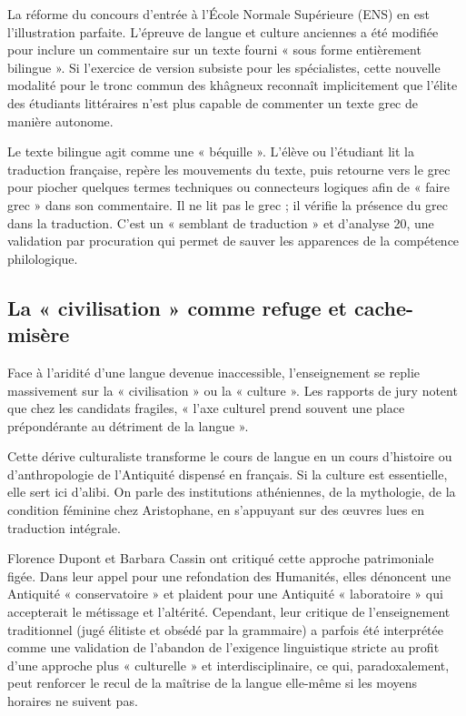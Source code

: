 La réforme du concours d'entrée à l'École Normale Supérieure (ENS) en est l'illustration parfaite.
L'épreuve de langue et culture anciennes a été modifiée pour inclure un commentaire sur un texte
fourni « sous forme entièrement bilingue ».\cite{I-3-3-ref17} Si l'exercice de version subsiste pour
les spécialistes, cette nouvelle modalité pour le tronc commun des khâgneux reconnaît implicitement
que l'élite des étudiants littéraires n'est plus capable de commenter un texte grec de manière
autonome.

Le texte bilingue agit comme une « béquille ».\cite{I-3-3-ref19} L'élève ou l'étudiant lit la
traduction française, repère les mouvements du texte, puis retourne vers le grec pour piocher
quelques termes techniques ou connecteurs logiques afin de « faire grec » dans son commentaire. Il
ne lit pas le grec ; il vérifie la présence du grec dans la traduction. C'est un « semblant de
traduction » et d'analyse 20, une validation par procuration qui permet de sauver les apparences de
la compétence philologique.



\subsection{La « civilisation » comme refuge et cache-misère}

Face à l'aridité d'une langue devenue inaccessible, l'enseignement se replie massivement sur la «
civilisation » ou la « culture ». Les rapports de jury notent que chez les candidats fragiles, «
l'axe culturel prend souvent une place prépondérante au détriment de la langue ».\cite{I-3-3-ref10}

Cette dérive culturaliste transforme le cours de langue en un cours d'histoire ou d'anthropologie de
l'Antiquité dispensé en français. Si la culture est essentielle, elle sert ici d'alibi. On parle des
institutions athéniennes, de la mythologie, de la condition féminine chez Aristophane, en s'appuyant
sur des œuvres lues en traduction intégrale.

Florence Dupont et Barbara Cassin ont critiqué cette approche patrimoniale figée. Dans leur appel
pour une refondation des Humanités, elles dénoncent une Antiquité « conservatoire » et plaident pour
une Antiquité « laboratoire » qui accepterait le métissage et l'altérité.\cite{I-3-3-ref21}
Cependant, leur critique de l'enseignement traditionnel (jugé élitiste et obsédé par la grammaire) a
parfois été interprétée comme une validation de l'abandon de l'exigence linguistique stricte au
profit d'une approche plus « culturelle » et interdisciplinaire, ce qui, paradoxalement, peut
renforcer le recul de la maîtrise de la langue elle-même si les moyens horaires ne suivent
pas.\cite{I-3-3-ref21}



